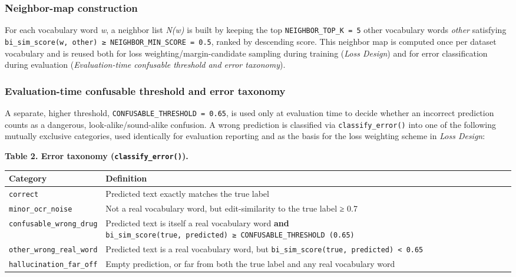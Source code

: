 \documentclass[fleqn,10pt]{wlpeerj}
\begin{document}
\subsubsection*{Neighbor-map construction}\label{sec:neighbor-map}

For each vocabulary word \emph{w}, a neighbor list \emph{N(w)} is built by keeping the top \texttt{NEIGHBOR\_TOP\_K\ =\ 5} other vocabulary words \emph{other} satisfying \texttt{bi\_sim\_score(w,\ other)\ ≥\ NEIGHBOR\_MIN\_SCORE\ =\ 0.5}, ranked by descending score. This neighbor map is computed once per dataset vocabulary and is reused both for loss weighting/margin-candidate sampling during training (\textit{Loss Design}) and for error classification during evaluation (\textit{Evaluation-time confusable threshold and error taxonomy}).

\subsubsection*{Evaluation-time confusable threshold and error taxonomy}\label{sec:eval-threshold}

A separate, higher threshold, \texttt{CONFUSABLE\_THRESHOLD\ =\ 0.65}, is used only at evaluation time to decide whether an incorrect prediction counts as a dangerous, look-alike/sound-alike confusion. A wrong prediction is classified via \texttt{classify\_error()} into one of the following mutually exclusive categories, used identically for evaluation reporting and as the basis for the loss weighting scheme in \textit{Loss Design}:

\textbf{Table 2. Error taxonomy (\texttt{classify\_error()}).}

\begin{longtable}[]{@{}
  >{\raggedright\arraybackslash}p{}
  >{\raggedright\arraybackslash}p{}@{}}
\toprule\noalign{}
\begin{minipage}[b]{\linewidth}\raggedright
Category
\end{minipage} & \begin{minipage}[b]{\linewidth}\raggedright
Definition
\end{minipage} \\
\midrule\noalign{}
\endhead
\bottomrule\noalign{}
\endlastfoot
\texttt{correct} & Predicted text exactly matches the true label \\
\texttt{minor\_ocr\_noise} & Not a real vocabulary word, but edit-similarity to the true label ≥ 0.7 \\
\texttt{confusable\_wrong\_drug} & Predicted text is itself a real vocabulary word \textbf{and} \texttt{bi\_sim\_score(true,\ predicted)\ ≥\ CONFUSABLE\_THRESHOLD\ (0.65)} \\
\texttt{other\_wrong\_real\_word} & Predicted text is a real vocabulary word, but \texttt{bi\_sim\_score(true,\ predicted)\ \textless{}\ 0.65} \\
\texttt{hallucination\_far\_off} & Empty prediction, or far from both the true label and any real vocabulary word \\
\end{longtable}
\end{document}
